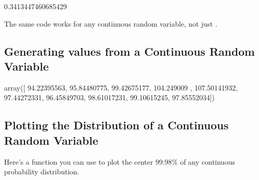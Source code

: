 \documentclass[letterpaper,10pt,english]{sphinxmanual}
\begin{document}
\begin{sphinxVerbatim}[commandchars=\\\{\}]
0.3413447460685429
\end{sphinxVerbatim}

The same code works for any continuous random variable, not just .


\subsection{Generating values from a Continuous Random Variable}
\label{\detokenize{GB213-review-in-Python:generating-values-from-a-continuous-random-variable}}
\begin{sphinxVerbatim}[commandchars=\\\{\}]
    
\end{sphinxVerbatim}

\begin{sphinxVerbatim}[commandchars=\\\{\}]
array([ 94.22395563,  95.84480775,  99.42675177, 104.249009  ,
       107.50141932,  97.44272331,  96.45849703,  98.61017231,
        99.10615245,  97.85552034])
\end{sphinxVerbatim}


\subsection{Plotting the Distribution of a Continuous Random Variable}
\label{\detokenize{GB213-review-in-Python:plotting-the-distribution-of-a-continuous-random-variable}}
Here’s a function you can use to plot the center 99.98\% of any continuous probability distribution.

\begin{sphinxVerbatim}[commandchars=\\\{\}]
    
            
          
        
       
\end{sphinxVerbatim}
\end{document}
